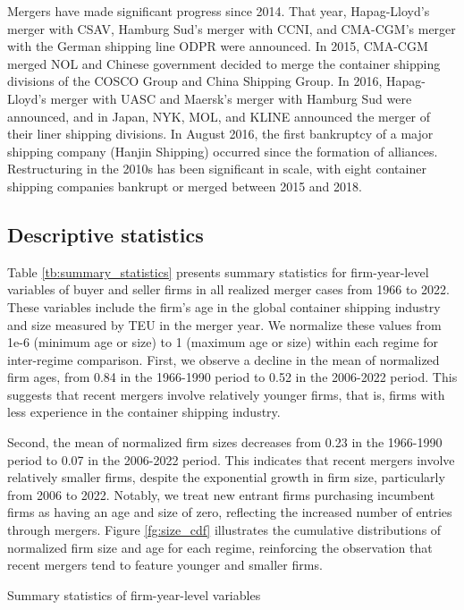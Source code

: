 \documentclass[10pt]{article}
\begin{document}
Mergers have made significant progress since 2014. 
That year, Hapag-Lloyd's merger with CSAV, Hamburg Sud's merger with CCNI, and CMA-CGM's merger with the German shipping line ODPR were announced.
In 2015, CMA-CGM merged NOL and Chinese government decided to merge the container shipping divisions of the COSCO Group and China Shipping Group.
In 2016, Hapag-Lloyd's merger with UASC and Maersk's merger with Hamburg Sud were announced, and in Japan, NYK, MOL, and KLINE announced the merger of their liner shipping divisions.
In August 2016, the first bankruptcy of a major shipping company (Hanjin Shipping) occurred since the formation of alliances.
Restructuring in the 2010s has been significant in scale, with eight container shipping companies bankrupt or merged between 2015 and 2018.



\subsection{Descriptive statistics}\label{sec:descriptive_statistics}

Table \ref{tb:summary_statistics} presents summary statistics for firm-year-level variables of buyer and seller firms in all realized merger cases from 1966 to 2022. 
These variables include the firm's age in the global container shipping industry and size measured by TEU in the merger year. 
We normalize these values from 1e-6 (minimum age or size) to 1 (maximum age or size) within each regime for inter-regime comparison.
First, we observe a decline in the mean of normalized firm ages, from 0.84 in the 1966-1990 period to 0.52 in the 2006-2022 period. 
This suggests that recent mergers involve relatively younger firms, that is, firms with less experience in the container shipping industry.

Second, the mean of normalized firm sizes decreases from 0.23 in the 1966-1990 period to 0.07 in the 2006-2022 period.
This indicates that recent mergers involve relatively smaller firms, despite the exponential growth in firm size, particularly from 2006 to 2022.
Notably, we treat new entrant firms purchasing incumbent firms as having an age and size of zero, reflecting the increased number of entries through mergers.
Figure \ref{fg:size_cdf} illustrates the cumulative distributions of normalized firm size and age for each regime, reinforcing the observation that recent mergers tend to feature younger and smaller firms.


\begin{table}[!htbp]
  \begin{center}
      \caption{Summary statistics of firm-year-level variables}
      \label{tb:summary_statistics} 
      \subfloat[CIY (1966-1990)]{}\\
      \subfloat[IHS (1991-2005)]{}\\
      \subfloat[HB (2006-2022)]{}
      
  \end{center}\footnotesize
\end{table} 
\end{document}
